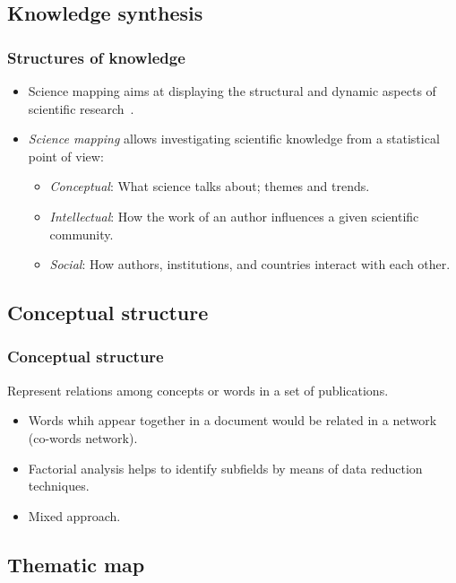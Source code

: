 \documentclass[aspectratio=169]{beamer}
\begin{document}
\subsection{Knowledge synthesis}


\begin{frame}
	\frametitle{Structures of knowledge}
	\begin{itemize}
		\item Science mapping aims at displaying the structural and dynamic aspects of
		      scientific research~\cite{borner2003}.
		\item \emph{Science mapping} allows investigating scientific knowledge from a
		      statistical point of view:
		      \begin{itemize}
			      \item \emph{Conceptual}: What science talks about; themes and 
                      trends.
			      \item \emph{Intellectual}: How the work of an author 
                      influences a given scientific community.
			      \item \emph{Social}: How authors, institutions, and countries 
                      interact with each other.
		      \end{itemize}
	\end{itemize}
\end{frame}


\subsection{Conceptual structure}


\begin{frame}
	\frametitle{Conceptual structure}
	Represent relations among concepts or words in a set of publications.
    \begin{itemize}
        \item Words whih appear together in a document would be related in a 
            network (co-words network). 
        \item Factorial analysis helps to identify subfields by means of data
            reduction techniques.
        \item Mixed approach.
    \end{itemize}
\end{frame}


\subsection{Thematic map}
\end{document}
